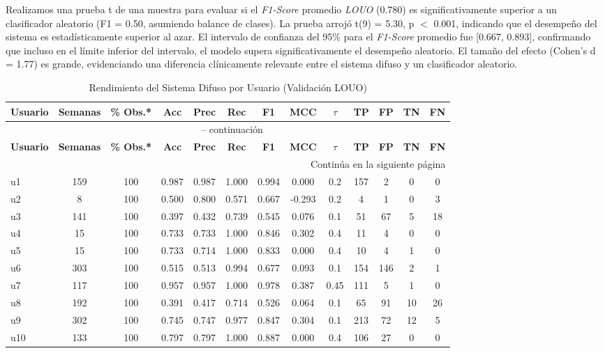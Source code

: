 Realizamos una prueba t de una muestra para evaluar si el \textit{F1-Score} promedio \textit{LOUO} (0.780) es significativamente superior a un clasificador aleatorio (F1 = 0.50, asumiendo balance de clases). La prueba arrojó t(9) = 5.30, p $<$ 0.001, indicando que el desempeño del sistema es estadísticamente superior al azar. El intervalo de confianza del 95\% para el \textit{F1-Score} promedio fue [0.667, 0.893], confirmando que incluso en el límite inferior del intervalo, el modelo supera significativamente el desempeño aleatorio. El tamaño del efecto (Cohen's d = 1.77) es grande, evidenciando una diferencia clínicamente relevante entre el sistema difuso y un clasificador aleatorio.

\begin{longtable}{@{}lcccccccccccc@{}}
\caption{Rendimiento del Sistema Difuso por Usuario (Validación LOUO)}
\label{tab:rendimiento_louo} \\
\toprule
\textbf{Usuario} & \textbf{Semanas} & \textbf{\% Obs.*} & \textbf{Acc} & \textbf{Prec} & \textbf{Rec} & \textbf{F1} & \textbf{MCC} & \textbf{$\tau$} & \textbf{TP} & \textbf{FP} & \textbf{TN} & \textbf{FN} \\
\midrule
\endfirsthead
\multicolumn{13}{c}{\tablename\ \thetable{} -- continuación} \\
\toprule
\textbf{Usuario} & \textbf{Semanas} & \textbf{\% Obs.*} & \textbf{Acc} & \textbf{Prec} & \textbf{Rec} & \textbf{F1} & \textbf{MCC} & \textbf{$\tau$} & \textbf{TP} & \textbf{FP} & \textbf{TN} & \textbf{FN} \\
\midrule
\endhead
\midrule
\multicolumn{13}{r}{Continúa en la siguiente página} \\
\endfoot
\bottomrule
\endlastfoot
u1  & 159 & 100 & 0.987 & 0.987 & 1.000 & 0.994 & 0.000 & 0.2 & 157 & 2   & 0  & 0 \\
u2  & 8   & 100 & 0.500 & 0.800 & 0.571 & 0.667 & -0.293 & 0.2 & 4   & 1   & 0  & 3 \\
u3  & 141 & 100 & 0.397 & 0.432 & 0.739 & 0.545 & 0.076 & 0.1 & 51  & 67  & 5  & 18 \\
u4  & 15  & 100 & 0.733 & 0.733 & 1.000 & 0.846 & 0.302 & 0.4 & 11  & 4   & 0  & 0 \\
u5  & 15  & 100 & 0.733 & 0.714 & 1.000 & 0.833 & 0.000 & 0.4 & 10  & 4   & 1  & 0 \\
u6  & 303 & 100 & 0.515 & 0.513 & 0.994 & 0.677 & 0.093 & 0.1 & 154 & 146 & 2  & 1 \\
u7  & 117 & 100 & 0.957 & 0.957 & 1.000 & 0.978 & 0.387 & 0.45 & 111 & 5   & 1  & 0 \\
u8  & 192 & 100 & 0.391 & 0.417 & 0.714 & 0.526 & 0.064 & 0.1 & 65  & 91  & 10 & 26 \\
u9  & 302 & 100 & 0.745 & 0.747 & 0.977 & 0.847 & 0.304 & 0.1 & 213 & 72  & 12 & 5 \\
u10 & 133 & 100 & 0.797 & 0.797 & 1.000 & 0.887 & 0.000 & 0.4 & 106 & 27  & 0  & 0 \\
\end{longtable}

